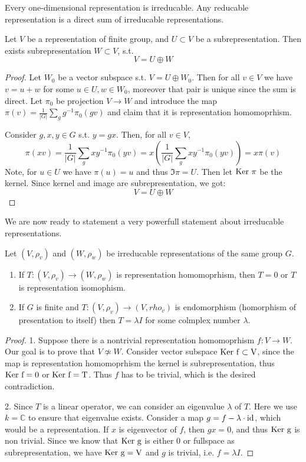 \documentclass{amsart}
\def\ker{\rm Ker\ }
\def\id{\rm id}
\begin{document}
\begin{lemma}
    Every one-dimensional representation is irreducable. Any reducable representation is a direct sum of irreducable representations.
\end{lemma}

\begin{theorem}
    Let $V$ be a representation of finite group, and $U \subset V$ be a subrepresentation. Then exists subrepresentation $W\subset V$, s.t.
    $$ V = U \oplus W$$
\end{theorem}

\begin{proof}
    Let $W_0$ be a vector subspace s.t. $V = U \oplus W_0$. Then for all $v \in V$ we have $v=u+w$ for some $u \in U, w \in W_0$, moreover that pair is unique since the sum is direct. Let $\pi_0$ be projection $V \to W$ and introduce the map
    $\pi(v) = \frac 1 {|G|} \sum_g g^{-1} \pi_0 (gv)$ and claim that it is representation homomoprhism.
    
    Consider $g,x,y \in G$ s.t. $y=gx$. Then, for all $v \in V$,
    $$\pi(xv) = \frac 1 {|G|} \sum_g x y^{-1} \pi_0 (yv) = x (\frac 1 {|G|} \sum_g x y^{-1} \pi_0 (yv)) = x \pi(v)$$
    Note, for $u \in U$ we have $\pi(u) = u$ and thus $\Im \pi = U$. Then let $\ker \pi$ be the kernel. Since kernel and image are subrepresentation, we got:
    $$ V = U \oplus W$$ 
\end{proof}

We are now ready to statement a very powerfull statement about irreducable representations.

\begin{lemma}
    Let $(V, \rho_v)$ and $(W, \rho_w)$ be irreducable representations of the same group $G$.
    \begin{enumerate}
        \item If $T: (V, \rho_v) \to (W, \rho_w)$ is representation homomoprhism, then $T=0$ or $T$ is representation isomophism.
        \item If $G$ is finite and $T : (V, \rho_v) \to (V, rho_v) $ is endomorphism (homorphism of presentation to itself) then $T = \lambda I$ for some colmplex number $\lambda$.
    \end{enumerate}
\end{lemma}
\begin{proof} 
    1. Suppose there is a nontrivial representation homomoprhism $f : V \to W$. Our goal is to prove that $V \not\simeq W$. Consider vector subspace $\ker f \subset V$, since the map is representation homomoprhism the kernel is subrepresentation, thus $\ker f = 0$ or $\ker f = T$. Thus $f$ has to be trivial, which is the desired contradiction. 
    
    2. Since $T$ is a linear operator, we can consider an eigenvalue $\lambda$ of $T$. Here we use $k = \mathbb{C}$ to ensure that eigenvalue exists. Consider a map $g = f - \lambda \cdot \id$, which would be a representation. If $x$ is eigenvector of $f$, then $g x = 0$, and thus $\ker g$ is non trivial. Since we know that 
    $\ker g$ is either 0 or fullspace as subrepresentation, we have $\ker g = V$ and $g$ is trivial, i.e. $f = \lambda I$.
\end{proof}
\end{document}
